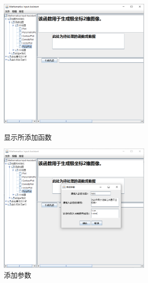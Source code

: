 \documentclass[hyperref, UTF8
,bookmarksnumbered=true, oneside]{ctexbook}
\begin{document}
\begin{itemize}
            	\begin{figure}[!h]
	                \begin{minipage}[b]{0.45\textwidth}
	                \centering
	                \includegraphics[width=3in]{12.png}
	                \caption{显示所添加函数}
	                \label{pic:MathPack}
	                \end{minipage}%
	                \hspace{0.1\textwidth}%
	                \begin{minipage}[b]{0.45\textwidth}
	                \centering
	                \includegraphics[width=3in]{13.png}
	                \caption{添加参数}
	                \label{pic:GUIPack}
	                \end{minipage}
            	\end{figure}


\end{itemize}
\end{document}
